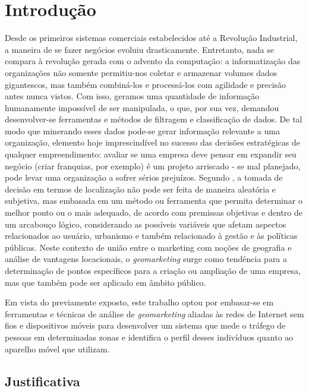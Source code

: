 
\chapter{Introdução}
\label{introducao}

Desde os primeiros sistemas comerciais estabelecidos até a Revolução Industrial,
a maneira de se fazer negócios evoluiu drasticamente. Entretanto, nada se
compara à revolução gerada com o advento da computação: a informatização das
organizações não somente permitiu-nos coletar e armazenar volumes dados
gigantescos, mas também combiná-los e processá-los com agilidade e precisão antes nunca
vistos. Com isso, geramos uma quantidade de informação humanamente impossível de
ser manipulada, o que, por sua vez, demandou desenvolver-se ferramentas e
métodos de filtragem e classificação de dados. De tal modo que minerando esses dados pode-se gerar
informação relevante a uma organização, elemento hoje imprescindível no sucesso
das decisões estratégicas de qualquer empreendimento: avaliar se uma empresa
deve pensar em expandir seu negócio (criar franquias, por exemplo) é um projeto
arriscado - se mal planejado, pode levar uma organização a sofrer sérios
prejuízos. Segundo , a tomada de decisão em termos de
localização não pode ser feita de maneira aleatória e subjetiva, mas embasada em
um método ou ferramenta que permita determinar o melhor ponto ou o mais
adequado, de acordo com premissas objetivas e dentro de um arcabouço lógico,
considerando as possíveis variáveis que afetam aspectos relacionados ao usuário,
urbanismo e também relacionado à gestão e às políticas públicas. Neste contexto
de união entre o marketing com noções de geografia e análise de vantagens
locacionais, o \emph{geomarketing} surge como tendência para a determinação de
pontos específicos para a criação ou ampliação de uma empresa, mas que também pode ser aplicado em âmbito público.

Em vista do previamente exposto, este trabalho optou por embasar-se em
ferramentas e técnicas de análise de \emph{geomarketing} aliadas às redes de
Internet sem fios e dispositivos móveis para desenvolver
um sistema que mede o tráfego de pessoas em determinadas zonas e identifica o
perfil desses indivíduos quanto ao aparelho móvel que utilizam.

\section{Justificativa}
\label{justificativa}

